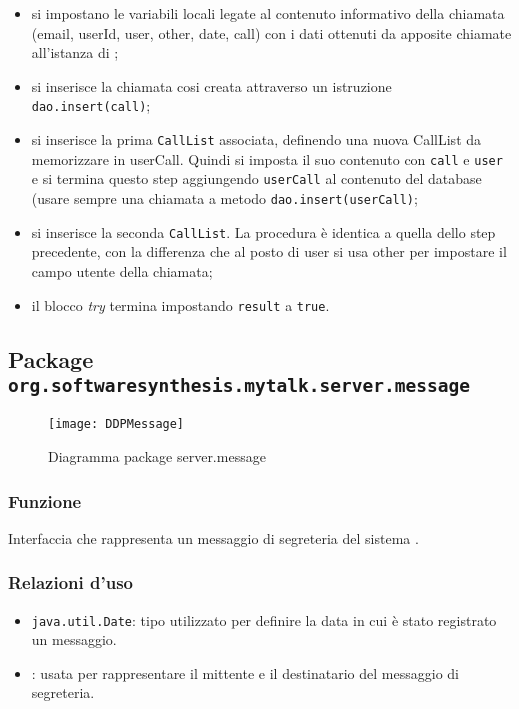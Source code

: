 \begin{description}
\begin{itemize}
	\item si impostano le variabili locali legate al contenuto informativo della chiamata (email, userId, user, other, date, call) con i dati ottenuti da apposite chiamate all'istanza di ;
	\item si inserisce la chiamata cosi creata attraverso un istruzione \texttt{dao.insert(call)};
	\item si inserisce la prima \texttt{CallList} associata, definendo una nuova CallList da memorizzare in userCall. Quindi si imposta il suo contenuto con \texttt{call} e \texttt{user} e si termina questo step aggiungendo \texttt{userCall} al contenuto del database (usare sempre una chiamata a metodo \texttt{dao.insert(userCall)};
	\item si inserisce la seconda \texttt{CallList}. La procedura è identica a quella dello step precedente, con la differenza che  al posto di user si usa other per impostare il campo utente della chiamata;
	\item il blocco \textit{try} termina impostando \texttt{result} a \texttt{true}.
\end{itemize}

\end{description}

\subsection{Package \texttt{org.softwaresynthesis.mytalk.server.message}}\label{sec:message}

\begin{center}
\begin{figure}[H]
  \texttt{[image: DDPMessage]}
\caption{Diagramma package server.message}
\end{figure}
\end{center}



\subsubsection*{Funzione}
Interfaccia che rappresenta un messaggio di segreteria del sistema \caName.

\subsubsection*{Relazioni d'uso}
\begin{itemize}
	\item \texttt{java.util.Date}: tipo utilizzato per definire la data in cui è stato registrato un messaggio.
	\item {}: usata per rappresentare il mittente e il destinatario del messaggio di segreteria.
\end{itemize}

